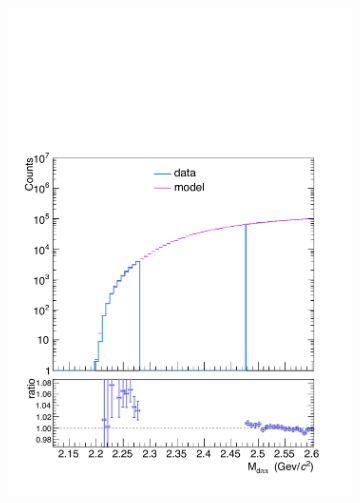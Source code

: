 \begin{figure}
\begin{subfigure}{.33\textwidth}
  \centering
  \captionsetup{justification=centering}
  \includegraphics[width=\linewidth]{gfx/PEMimp0}
  \caption{}
  \label{fig:pem_imp01}
\end{subfigure}%
\begin{subfigure}{.33\textwidth}
  \centering
  \captionsetup{justification=centering}

\end{subfigure}
\end{figure}
